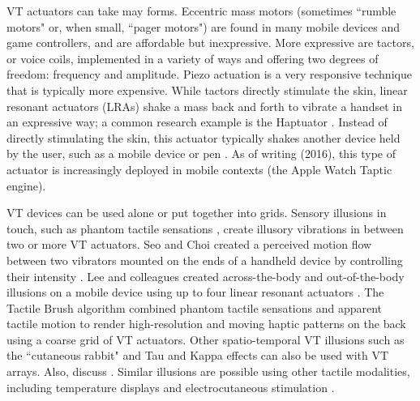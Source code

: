 VT actuators can take may forms. Eccentric mass motors (sometimes ``rumble motors" or, when small, ``pager motors") are found in many mobile devices and game controllers, and are affordable but inexpressive.
More expressive are tactors, or voice coils, implemented in a variety of ways and offering two degrees of freedom: frequency and amplitude.
Piezo actuation is a very responsive technique that is typically more expensive.
While tactors directly stimulate the skin, linear resonant actuators (LRAs) shake a mass back and forth to vibrate a handset in an expressive way; a common research example is the Haptuator \cite{Yao2010}.
Instead of directly stimulating the skin, this actuator typically shakes another device held by the user, such as a mobile device \cite{Yoo2014} or pen \cite{Culbertson2014}.
As of writing (2016), this type of actuator is increasingly deployed in mobile contexts (\eg the Apple Watch Taptic engine).

VT devices can be used alone or put together into grids.
Sensory illusions in touch, such as phantom tactile sensations \cite{Alles1970}, create illusory vibrations in between two or more VT actuators.
Seo and Choi created a perceived motion flow between two vibrators mounted on the ends of a handheld device by controlling their intensity  \cite{Seo2010}.
Lee and colleagues created across-the-body and out-of-the-body illusions on a mobile device using up to four %
linear resonant actuators \cite{Lee2012a}.
The Tactile Brush algorithm \cite{Israr2011a} combined phantom tactile sensations and apparent tactile motion to render high-resolution and moving haptic patterns on the back using a coarse grid of VT actuators. 
Other spatio-temporal VT illusions such as the  ``cutaneous rabbit"  \cite{Tan2009} and Tau and Kappa effects \cite{Hayward2008} can also be used with VT arrays.
Also, discuss \cite{Yoo2014a}.
Similar illusions are possible using other tactile modalities, including temperature displays \cite{Singhal2016} and electrocutaneous stimulation \cite{Tanie1980}.

